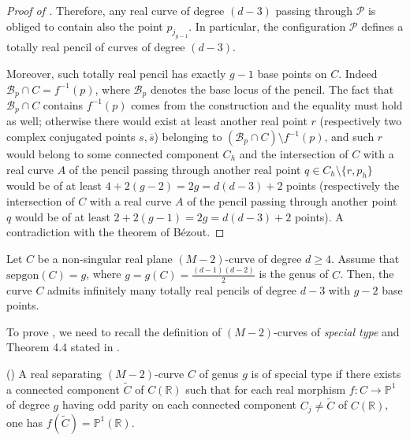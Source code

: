 \begin{proof}[Proof of ]
 Therefore, any real curve of degree $(d-3)$ passing through $\mathcal P$ is obliged to contain also the point $p_{j_{g-1}}$. In particular, the configuration $\mathcal P$ defines a totally real pencil of curves of degree $(d-3)$.

Moreover, such totally real pencil has exactly $g-1$ base points on $C$. Indeed $\mathcal B_p \cap C=f^{-1}(p)$, where $\mathcal B_p$ denotes the base locus of the pencil. The fact that $\mathcal B_p \cap C$ contains $f^{-1}(p)$ comes from the construction and the equality must hold as well; otherwise there would exist at least another real point $r$ (respectively two complex conjugated points $s,\overline s$) belonging to $(\mathcal B_p \cap C )\setminus f^{-1}(p)$, and such $r$ would belong to some connected component $C_h$ and the intersection of $C$ with a real curve $A$ of the pencil passing through another real point $q \in C_h \setminus \{r, p_h \}$ would be of at least $4+2(g-2)=2g=d(d-3)+2$ points (respectively the intersection of $C$ with a real curve $A$ of the pencil passing through another point $q$ would be of at least $2+2(g-1)=2g=d(d-3)+2$ points). A contradiction with the theorem of B\'ezout. 
\end{proof}

\begin{prop}
	\label{prop: sepgon_m-2_g}
	Let $C$ be a non-singular real plane $(M-2)$-curve of degree $d \geq 4$. Assume that $\text{sepgon}(C)=g$, where $g=g(C)=\frac{(d-1)(d-2)}{2}$ is the genus of $C$. Then, the curve $C$ admits infinitely many totally real pencils of degree $d-3$ with $g-2$ base points.
\end{prop}

To prove , we need to recall the definition of $(M-2)$-curves of \textit{special type} and Theorem 4.4 stated in \cite{Copp14}.

\begin{defn}(\cite[Definition 2.2]{Copp14})
\label{defn: special_type}
	A real separating $(M-2)$-curve $C$ of genus $g$ is of special type if there exists a connected component $\tilde C$ of $C(\mathbb R)$ such that for each real morphism $f: C \rightarrow \mathbb P^1$ of degree $g$ having odd parity on each connected component $C_j \not= \tilde C$ of $C(\mathbb R)$, one has $f(\tilde C)= \mathbb P^1(\mathbb R)$.
\end{defn}

